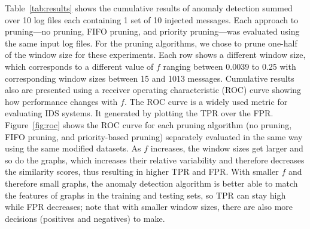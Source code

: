 Table~\ref{tab:results} shows the cumulative results of anomaly detection summed over 10 log files each containing 1 set of 10 injected messages. Each approach to pruning---no pruning, FIFO pruning, and priority pruning---was evaluated using the same input log files.  For the pruning algorithms, we chose to prune one-half of the window size for these experiments. Each row shows a different window size, which corresponds to a different value of $f$ ranging between 0.0039 to 0.25 with corresponding window sizes between 15 and 1013 messages. Cumulative results also are presented using a receiver operating characteristic (ROC) curve showing how performance changes with $f$. The ROC curve is a widely used metric for evaluating IDS systems. It generated by plotting the TPR over the FPR. Figure~\ref{fig:roc} shows the ROC curve for each pruning algorithm (no pruning, FIFO pruning, and priority-based pruning) separately evaluated in the same way using the same modified datasets. As $f$ increases, the window sizes get larger and so do the graphs, which increases their relative variability and therefore decreases the similarity scores, thus resulting in higher TPR and FPR. With smaller $f$ and therefore small graphs, the anomaly detection algorithm is better able to match the features of graphs in the training and testing sets, so TPR can stay high while FPR decreases; note that with smaller window sizes, there are also more decisions (positives and negatives) to make. 

